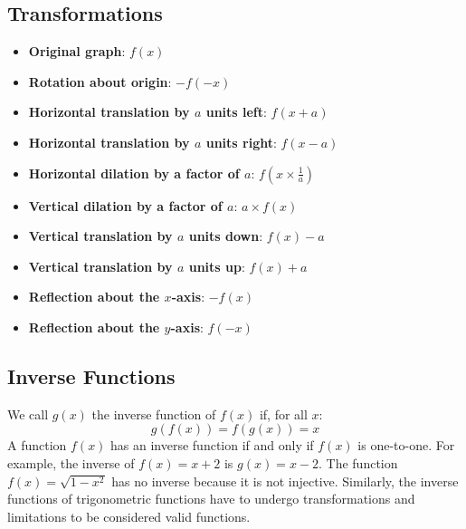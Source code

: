 \subsection{Transformations}
\label{sss:tran-dfc3}

\begin{itemize}
    \item \textbf{Original graph}: $f(x)$
    \item \textbf{Rotation about origin}: $-f(-x)$
    \item \textbf{Horizontal translation by $a$ units left}: $f(x + a)$
    \item \textbf{Horizontal translation by $a$ units right}: $f(x - a)$
    \item \textbf{Horizontal dilation by a factor of $a$}: $f\left(x \times \frac{1}{a}\right)$
    \item \textbf{Vertical dilation by a factor of $a$}: $a \times f(x)$
    \item \textbf{Vertical translation by $a$ units down}: $f(x) - a$
    \item \textbf{Vertical translation by $a$ units up}: $f(x) + a$
    \item \textbf{Reflection about the $x$-axis}: $-f(x)$
    \item \textbf{Reflection about the $y$-axis}: $f(-x)$
\end{itemize}

\subsection{Inverse Functions}
\label{sss:inve-f81e}

We call $g(x)$ the inverse function of $f(x)$ if, for all $x$:
\[
g(f(x)) = f(g(x)) = x
\]
A function $f(x)$ has an inverse function if and only if $f(x)$ is one-to-one. For example, the inverse of $f(x) = x + 2$ is $g(x) = x - 2$. The function $f(x) = \sqrt{1 - x^2}$ has no inverse because it is not injective. Similarly, the inverse functions of trigonometric functions have to undergo transformations and limitations to be considered valid functions.


